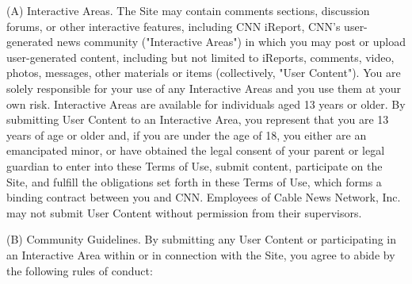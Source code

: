 (A) Interactive Areas. The Site may contain comments sections,
discussion forums, or other interactive features, including CNN iReport,
CNN's user-generated news community ("Interactive Areas") in which you
may post or upload user-generated content, including but not limited to
iReports, comments, video, photos, messages, other materials or items
(collectively, "User Content"). You are solely responsible for your use
of any Interactive Areas and you use them at your own risk. Interactive
Areas are available for individuals aged 13 years or older. By
submitting User Content to an Interactive Area, you represent that you
are 13 years of age or older and, if you are under the age of 18, you
either are an emancipated minor, or have obtained the legal consent of
your parent or legal guardian to enter into these Terms of Use, submit
content, participate on the Site, and fulfill the obligations set forth
in these Terms of Use, which forms a binding contract between you and
CNN. Employees of Cable News Network, Inc. may not submit User Content
without permission from their supervisors.

(B) Community Guidelines. By submitting any User Content or
participating in an Interactive Area within or in connection with the
Site, you agree to abide by the following rules of conduct:

